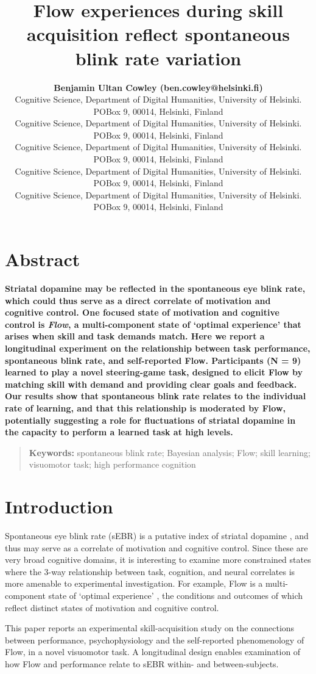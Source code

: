\documentclass[10pt,letterpaper,floatsintext]{article}
\title{Flow experiences during skill acquisition reflect spontaneous blink rate variation}
\author{{\large \bf Benjamin Ultan Cowley (ben.cowley@helsinki.fi)} \\
  Cognitive Science, Department of Digital Humanities, University of Helsinki. POBox 9, 00014, Helsinki, Finland
  \AND {\large \bf Roosa Frantsi (roosa.frantsi@helsinki.fi)} \\
	  Cognitive Science, Department of Digital Humanities, University of Helsinki. POBox 9, 00014, Helsinki, Finland
  \AND {\large \bf Pasi P\"{o}l\"{o}nen (pasi.polonen@helsinki.fi)} \\
	  Cognitive Science, Department of Digital Humanities, University of Helsinki. POBox 9, 00014, Helsinki, Finland
  \AND {\large \bf Ville-Pekka Inkil\"{a} (ville-pekka.inkile@helsinki.fi)} \\
	  Cognitive Science, Department of Digital Humanities, University of Helsinki. POBox 9, 00014, Helsinki, Finland
  \AND {\large \bf Jussi Palom\"{a}ki (jussi.palomaki@helsinki.fi)} \\
	  Cognitive Science, Department of Digital Humanities, University of Helsinki. POBox 9, 00014, Helsinki, Finland
  }
\begin{document}
\maketitle


\section{Abstract}
{
\bf
Striatal dopamine may be reflected in the spontaneous eye blink rate, which could thus serve as a direct correlate of motivation and cognitive control. One focused state of motivation and cognitive control is \textit{Flow}, a multi-component state of `optimal experience' that arises when skill and task demands match. Here we report a longitudinal experiment on the relationship between task performance, spontaneous blink rate, and self-reported Flow. Participants (N = 9) learned to play a novel steering-game task, designed to elicit Flow by matching skill with demand and providing clear goals and feedback. Our results show that spontaneous blink rate relates to the individual rate of learning, and that this relationship is moderated by Flow, potentially suggesting a role for fluctuations of striatal dopamine in the capacity to perform a learned task at high levels.
}
\begin{quote}
\small
\textbf{Keywords:}
spontaneous blink rate; Bayesian analysis; Flow; skill learning; visuomotor task; high performance cognition
\end{quote}


\section{Introduction}

Spontaneous eye blink rate (sEBR) is a putative index of striatal dopamine \cite{Slagter2012}, and thus may serve as a correlate of motivation and cognitive control. Since these are very broad cognitive domains, it is interesting to examine more constrained states where the 3-way relationship between task, cognition, and neural correlates is more amenable to experimental investigation. For example, Flow is a multi-component state of `optimal experience' \cite{Csikszentmihalyi1975}, the conditions and outcomes of which reflect distinct states of motivation and cognitive control.

This paper reports an experimental skill-acquisition study on the connections between performance, psychophysiology and the self-reported phenomenology of Flow, in a novel visuomotor task. A longitudinal design enables examination of how Flow and performance relate to sEBR within- and between-subjects.
\end{document}
